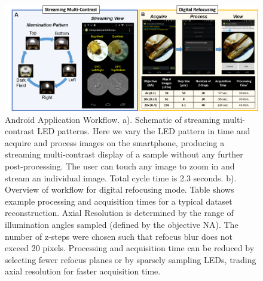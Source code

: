 \begin{figure}
\begin{center}
\includegraphics[width=\textwidth]{figures/fig_ccs_app.png}
\end{center}
\caption {{Android Application Workflow.} {a).} Schematic of streaming multi-contrast LED patterns. Here we vary the LED pattern in time and acquire and process images on the smartphone, producing a streaming multi-contrast display of a sample without any further post-processing. The user can touch any image to zoom in and stream an individual image. Total cycle time is 2.3 seconds.
{b).} Overview of workflow for digital refocusing mode. Table shows example processing and acquisition times for a typical dataset reconstruction. Axial Resolution is determined by the range of illumination angles sampled (defined by the objective NA). The number of z-steps were chosen such that refocus blur does not exceed 20 pixels. Processing and acquisition time can be reduced by selecting fewer refocus planes or by sparsely sampling LEDs, trading axial resolution for faster acquisition time.}

\label{fig:android}
\end{figure}


